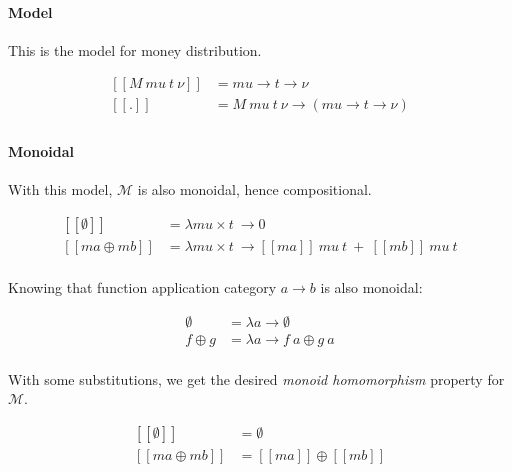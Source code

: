 \paragraph{Model}

This is the model for money distribution.

\begin{equation}\label{md_model}
    \begin{split}
        [\![M\ mu\ t\ \nu]\!] &= mu \rightarrow t \rightarrow \nu \\
        [\![.]\!] &= M\ mu\ t\ \nu \rightarrow (mu \rightarrow t \rightarrow \nu) \\
    \end{split}
\end{equation}

\paragraph{Monoidal}

With this model, $\mathcal{M}$ is also monoidal, hence compositional.

\begin{equation}
    \begin{split}
        [\![\emptyset]\!] &= \lambda mu \times t\ \rightarrow 0 \\
        [\![ma \oplus mb]\!] &= \lambda mu \times t\ \rightarrow [\![ma]\!]\ mu\ t\ +\ [\![mb]\!]\ mu\ t \\
    \end{split}
\end{equation}

Knowing that function application category $a \rightarrow b$ is also monoidal:

\begin{equation}
    \begin{split}
        \emptyset &= \lambda a \rightarrow \emptyset \\
        f \oplus g &= \lambda a \rightarrow f\ a \oplus g\ a \\
    \end{split}
\end{equation}

With some substitutions, we get the desired \textit{monoid homomorphism} property for $\mathcal{M}$.

\begin{equation}
    \begin{split}
        [\![\emptyset]\!] &= \emptyset \\
        [\![ma \oplus mb]\!] &= [\![ma]\!] \oplus [\![mb]\!] \\
    \end{split}
\end{equation}

